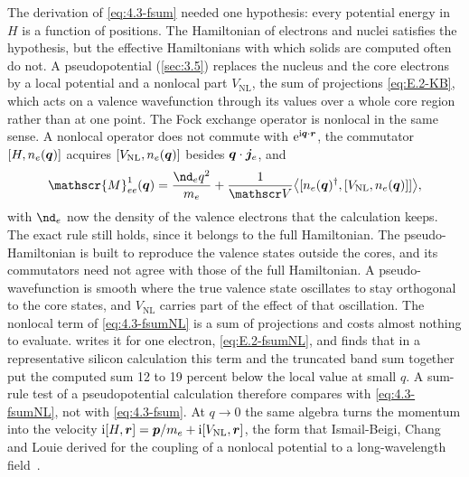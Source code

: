 The derivation of \cref{eq:4.3-fsum} needed one hypothesis: every potential energy in $H$ is a function of positions. The Hamiltonian of electrons and nuclei satisfies the hypothesis, but the effective Hamiltonians with which solids are computed often do not. A pseudopotential (\cref{sec:3.5}) replaces the nucleus and the core electrons by a local potential and a nonlocal part $V_{\mathrm{NL}}$, the sum of projections \cref{eq:E.2-KB}, which acts on a valence wavefunction through its values over a whole core region rather than at one point. The Fock exchange operator is nonlocal in the same sense. A nonlocal operator does not commute with $\mathrm{e}^{\mathrm{i}\bm{q}\cdot\bm{r}}$, the commutator $[H, n_e(\bm{q})]$ acquires $[V_{\mathrm{NL}}, n_e(\bm{q})]$ besides $\bm{q}\cdot\bm{j}_e$, and
\begin{equation}
  \mathscr{M}^1_{ee}(\vect{q}) = \frac{\nd_eq^2}{m_e} + \frac{1}{\Vol}\bigl\langle[n_e(\vect{q})^\dagger, [V_{\mathrm{NL}}, n_e(\vect{q})]]\bigr\rangle ,
  \label{eq:4.3-fsumNL}
\end{equation}
with $\nd_e$ now the density of the valence electrons that the calculation keeps. The exact rule still holds, since it belongs to the full Hamiltonian. The pseudo-Hamiltonian is built to reproduce the valence states outside the cores, and its commutators need not agree with those of the full Hamiltonian. A pseudo-wavefunction is smooth where the true valence state oscillates to stay orthogonal to the core states, and $V_{\mathrm{NL}}$ carries part of the effect of that oscillation. The nonlocal term of \cref{eq:4.3-fsumNL} is a sum of projections and costs almost nothing to evaluate.  writes it for one electron, \cref{eq:E.2-fsumNL}, and finds that in a representative silicon calculation this term and the truncated band sum together put the computed sum 12 to 19 percent below the local value at small $q$. A sum-rule test of a pseudopotential calculation therefore compares with \cref{eq:4.3-fsumNL}, not with \cref{eq:4.3-fsum}. At $q \to 0$ the same algebra turns the momentum into the velocity $\mathrm{i}[H, \bm{r}] = \bm{p}/m_e + \mathrm{i}[V_{\mathrm{NL}}, \bm{r}]$, the form that Ismail-Beigi, Chang and Louie derived for the coupling of a nonlocal potential to a long-wavelength field~\cite{ismailbeigi2001coupling}.

